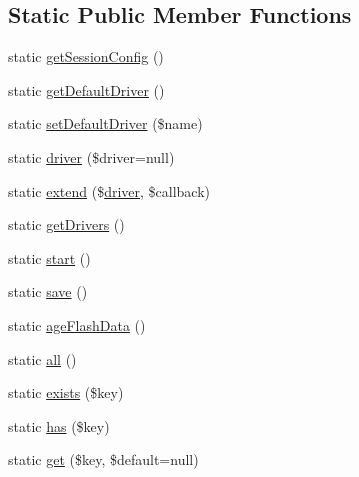 \subsection*{Static Public Member Functions}
\begin{DoxyCompactItemize}
\item 
static \mbox{\hyperlink{class_illuminate_1_1_support_1_1_facades_1_1_session_a5d2cd244257df0ca9095928c533c2961}{get\+Session\+Config}} ()
\item 
static \mbox{\hyperlink{class_illuminate_1_1_support_1_1_facades_1_1_session_a8c5396e20d9517c565477a95ad6ec59d}{get\+Default\+Driver}} ()
\item 
static \mbox{\hyperlink{class_illuminate_1_1_support_1_1_facades_1_1_session_ab3c55b60ab7d896d96956ede42264707}{set\+Default\+Driver}} (\$name)
\item 
static \mbox{\hyperlink{class_illuminate_1_1_support_1_1_facades_1_1_session_adea85131df36b0b3098ac988cc9a43e9}{driver}} (\$driver=null)
\item 
static \mbox{\hyperlink{class_illuminate_1_1_support_1_1_facades_1_1_session_a3a230d00cf6c47f41e1c825b40219388}{extend}} (\$\mbox{\hyperlink{class_illuminate_1_1_support_1_1_facades_1_1_session_adea85131df36b0b3098ac988cc9a43e9}{driver}}, \$callback)
\item 
static \mbox{\hyperlink{class_illuminate_1_1_support_1_1_facades_1_1_session_a2862a5e74f09768d53a46bb00a883c47}{get\+Drivers}} ()
\item 
static \mbox{\hyperlink{class_illuminate_1_1_support_1_1_facades_1_1_session_a4b7cd6921ea90fc4c5299a837c52b76f}{start}} ()
\item 
static \mbox{\hyperlink{class_illuminate_1_1_support_1_1_facades_1_1_session_a86a2b8a51cecddffc503d5d904dd7a19}{save}} ()
\item 
static \mbox{\hyperlink{class_illuminate_1_1_support_1_1_facades_1_1_session_a1b97cbfdfcab7ad5102446e3b00c453e}{age\+Flash\+Data}} ()
\item 
static \mbox{\hyperlink{class_illuminate_1_1_support_1_1_facades_1_1_session_af8daa13884abd4dd348aa122faec5951}{all}} ()
\item 
static \mbox{\hyperlink{class_illuminate_1_1_support_1_1_facades_1_1_session_a62f023cf1d39c1e67e5cb6094c7f94c6}{exists}} (\$key)
\item 
static \mbox{\hyperlink{class_illuminate_1_1_support_1_1_facades_1_1_session_a170192fd9348926c6f4f932164eaf127}{has}} (\$key)
\item 
static \mbox{\hyperlink{class_illuminate_1_1_support_1_1_facades_1_1_session_ac79802948a0e5a5522effec7fbcccb55}{get}} (\$key, \$default=null)

\end{DoxyCompactItemize}
